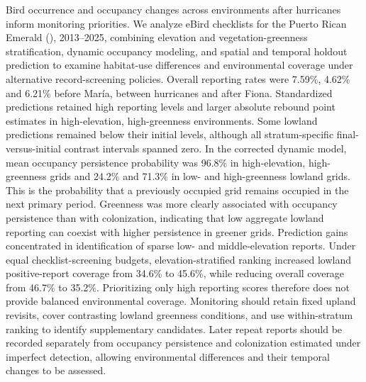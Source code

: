 Bird occurrence and occupancy changes across environments after hurricanes inform monitoring priorities. We analyze \nChecklists{} eBird checklists for the Puerto Rican Emerald (\Rm), 2013--2025, combining elevation and vegetation-greenness stratification, dynamic occupancy modeling, and spatial and temporal holdout prediction to examine habitat-use differences and environmental coverage under alternative record-screening policies. Overall reporting rates were 7.59\%, 4.62\% and 6.21\% before Mar\'ia, between hurricanes and after Fiona. Standardized predictions retained high reporting levels and larger absolute rebound point estimates in high-elevation, high-greenness environments. Some lowland predictions remained below their initial levels, although all stratum-specific final-versus-initial contrast intervals spanned zero. In the corrected dynamic model, mean occupancy persistence probability was 96.8\% in high-elevation, high-greenness grids and 24.2\% and 71.3\% in low- and high-greenness lowland grids. This is the probability that a previously occupied grid remains occupied in the next primary period. Greenness was more clearly associated with occupancy persistence than with colonization, indicating that low aggregate lowland reporting can coexist with higher persistence in greener grids. Prediction gains concentrated in identification of sparse low- and middle-elevation reports. Under equal checklist-screening budgets, elevation-stratified ranking increased lowland positive-report coverage from 34.6\% to 45.6\%, while reducing overall coverage from 46.7\% to 35.2\%. Prioritizing only high reporting scores therefore does not provide balanced environmental coverage. Monitoring should retain fixed upland revisits, cover contrasting lowland greenness conditions, and use within-stratum ranking to identify supplementary candidates. Later repeat reports should be recorded separately from occupancy persistence and colonization estimated under imperfect detection, allowing environmental differences and their temporal changes to be assessed.
